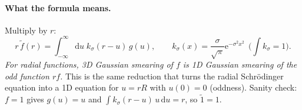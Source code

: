 \documentclass[11pt,a4paper]{article}
\numberwithin{equation}{section}
\theoremstyle{definition}
\theoremstyle{plain}
\theoremstyle{remark}
\numberwithin{algorithm}{section}
\newcommand{\dd}{\mathrm{d}}
\newcommand{\ee}{\mathrm{e}}
\begin{document}
\paragraph{What the formula means.} Multiply by $r$:
\begin{equation}
r\,\tilde f(r)=\int_{-\infty}^\infty\dd u\;k_\sigma(r-u)\,g(u),\qquad k_\sigma(x)=\frac{\sigma}{\sqrt\pi}\ee^{-\sigma^2x^2}\ \ \Big(\textstyle\int k_\sigma=1\Big).
\end{equation}
\emph{For radial functions, 3D Gaussian smearing of $f$ is 1D Gaussian smearing of the odd function $rf$.} This is the same reduction that turns the radial Schr\"odinger equation into a 1D equation for $u=rR$ with $u(0)=0$ (oddness). Sanity check: $f=1$ gives $g(u)=u$ and $\int k_\sigma(r-u)\,u\,\dd u=r$, so $\tilde1=1$.

\end{document}
